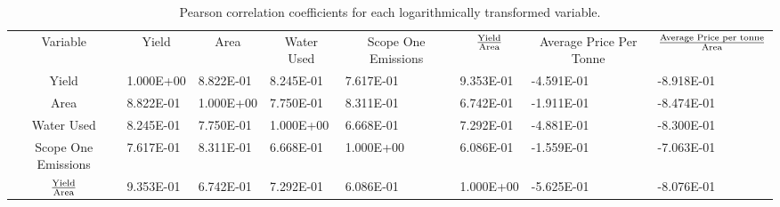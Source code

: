 \documentclass[12pt,australian]{article}
\begin{document}
\begin{sloppypar}
  \begin{table}[]
    \caption{Pearson correlation coefficients for each logarithmically transformed variable.}
    \label{tab:tab3}
    \begin{tabular}{clllllll}
    Variable                                           & \multicolumn{1}{c}{Yield} & \multicolumn{1}{c}{Area} & \multicolumn{1}{c}{Water Used} & \multicolumn{1}{c}{Scope One Emissions} & \multicolumn{1}{c}{$\text{Yield}\over\text{Area}$} & \multicolumn{1}{c}{Average Price Per Tonne} & \multicolumn{1}{c}{${\text{Average Price per tonne}\over\text{Area}}$} \\
    Yield                                              & 1.000E+00                 & 8.822E-01                & 8.245E-01                      & 7.617E-01                               & 9.353E-01                                          & -4.591E-01                                  & -8.918E-01                                                             \\
    Area                                               & 8.822E-01                 & 1.000E+00                & 7.750E-01                      & 8.311E-01                               & 6.742E-01                                          & -1.911E-01                                  & -8.474E-01                                                             \\
    Water Used                                         & 8.245E-01                 & 7.750E-01                & 1.000E+00                      & 6.668E-01                               & 7.292E-01                                          & -4.881E-01                                  & -8.300E-01                                                             \\
    Scope One Emissions                                & 7.617E-01                 & 8.311E-01                & 6.668E-01                      & 1.000E+00                               & 6.086E-01                                          & -1.559E-01                                  & -7.063E-01                                                             \\
    $\text{Yield}\over\text{Area}$                     & 9.353E-01                 & 6.742E-01                & 7.292E-01                      & 6.086E-01                               & 1.000E+00                                          & -5.625E-01                                  & -8.076E-01                                                             \\

\end{tabular}
\end{table}
\end{sloppypar}
\end{document}
